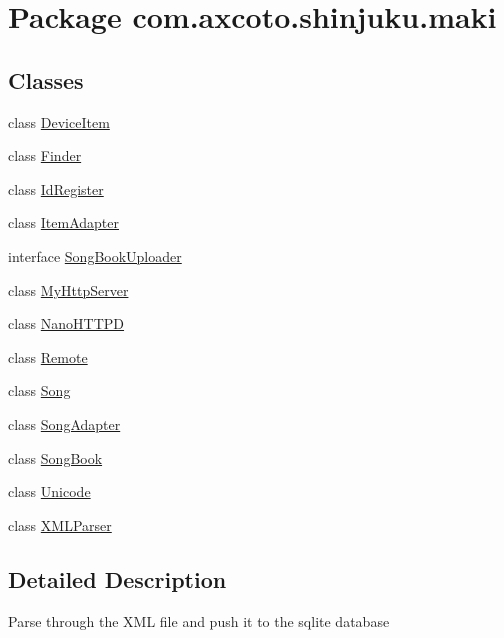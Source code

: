 \hypertarget{namespacecom_1_1axcoto_1_1shinjuku_1_1maki}{\section{\-Package com.\-axcoto.\-shinjuku.\-maki}
\label{namespacecom_1_1axcoto_1_1shinjuku_1_1maki}
}
\subsection*{\-Classes}
\begin{DoxyCompactItemize}
\item 
class \hyperlink{classcom_1_1axcoto_1_1shinjuku_1_1maki_1_1_device_item}{\-Device\-Item}
\item 
class \hyperlink{classcom_1_1axcoto_1_1shinjuku_1_1maki_1_1_finder}{\-Finder}
\item 
class \hyperlink{classcom_1_1axcoto_1_1shinjuku_1_1maki_1_1_id_register}{\-Id\-Register}
\item 
class \hyperlink{classcom_1_1axcoto_1_1shinjuku_1_1maki_1_1_item_adapter}{\-Item\-Adapter}
\item 
interface \hyperlink{interfacecom_1_1axcoto_1_1shinjuku_1_1maki_1_1_song_book_uploader}{\-Song\-Book\-Uploader}
\item 
class \hyperlink{classcom_1_1axcoto_1_1shinjuku_1_1maki_1_1_my_http_server}{\-My\-Http\-Server}
\item 
class \hyperlink{classcom_1_1axcoto_1_1shinjuku_1_1maki_1_1_nano_h_t_t_p_d}{\-Nano\-H\-T\-T\-P\-D}
\item 
class \hyperlink{classcom_1_1axcoto_1_1shinjuku_1_1maki_1_1_remote}{\-Remote}
\item 
class \hyperlink{classcom_1_1axcoto_1_1shinjuku_1_1maki_1_1_song}{\-Song}
\item 
class \hyperlink{classcom_1_1axcoto_1_1shinjuku_1_1maki_1_1_song_adapter}{\-Song\-Adapter}
\item 
class \hyperlink{classcom_1_1axcoto_1_1shinjuku_1_1maki_1_1_song_book}{\-Song\-Book}
\item 
class \hyperlink{classcom_1_1axcoto_1_1shinjuku_1_1maki_1_1_unicode}{\-Unicode}
\item 
class \hyperlink{classcom_1_1axcoto_1_1shinjuku_1_1maki_1_1_x_m_l_parser}{\-X\-M\-L\-Parser}
\end{DoxyCompactItemize}


\subsection{\-Detailed \-Description}
\-Parse through the \-X\-M\-L file and push it to the sqlite database 